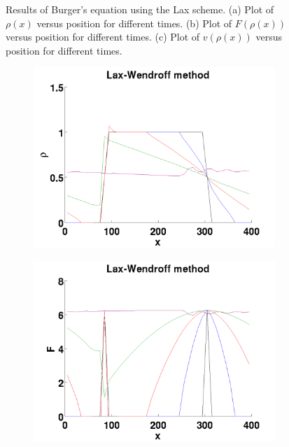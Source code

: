 \begin{figure}[h!]
\begin{subfigure}{.09\textwidth}
\end{subfigure}
\caption{Results of Burger's equation using the Lax scheme. (a) Plot of $\rho(x)$ versus position for different times. (b) Plot of $F(\rho(x))$ versus position for different times. (c) Plot of $v(\rho(x))$ versus position for different times.}
\label{fig:exc2_Lax_scheme}
\end{figure}

\begin{figure}[h!]
\begin{subfigure}{.25\textwidth}
	\centering
	\includegraphics[width=\textwidth]{img/exc2_LW_p}
	\caption{}
	\label{fig:exc2_LW_p}
\end{subfigure}
\begin{subfigure}{.25\textwidth}
	\centering
	\includegraphics[width=\textwidth]{img/exc2_LW_F}

\end{subfigure}
\end{figure}
